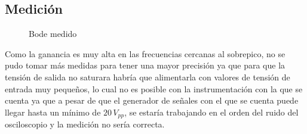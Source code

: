\documentclass[11pt, a4paper]{article}
\begin{document}
\subsection{Medición}
\begin{figure}[H]
	\begin{center}
		\caption{Bode medido}
		\label{fig:medicionderivador}
	\end{center}
\end{figure}


Como la ganancia es muy alta en las frecuencias cercanas al sobrepico, no se pudo tomar más medidas para tener una mayor precisión ya que para que la tensión de salida no saturara habría que alimentarla con valores de tensión de entrada muy pequeños, lo cual no es posible con la instrumentación con la que se cuenta ya que a pesar de que el generador de señales con el que se cuenta puede llegar hasta un mínimo de $20 \, V_{pp}$, se estaría trabajando en el orden del ruido del osciloscopio y la medición no sería correcta.
\end{document}
